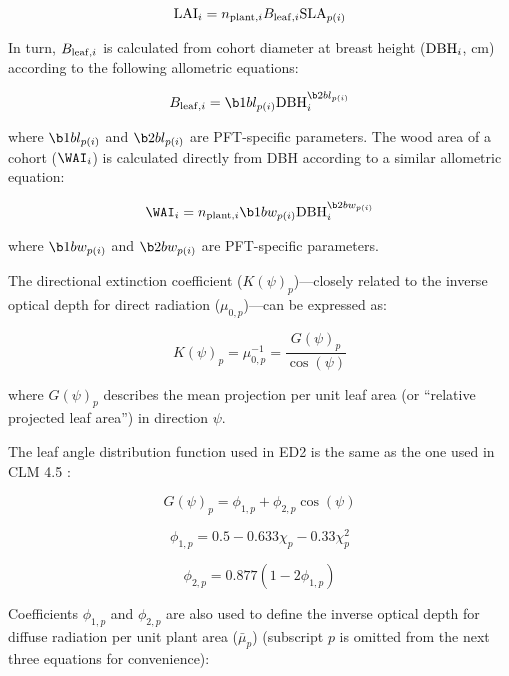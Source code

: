 \begin{equation}
  \mathrm{LAI}_{i} = n_{\mathrm{plant}, i} B_{\mathrm{leaf}, i} \mathrm{SLA}_{p(i)}
\end{equation}

In turn, $B_{\mathrm{leaf}, i}$ is calculated from cohort diameter at breast height ($\mathrm{DBH}_{i}$, \unit{cm}) according to the following allometric equations:

\begin{equation}
  B_{\leaf, i} = \b1bl_{p(i)} \DBH_{i}^{\b2bl_{p(i)}}
\end{equation}

where $\b1bl_{p(i)}$ and $\b2bl_{p(i)}$ are PFT-specific parameters.
The wood area of a cohort ($\WAI_{i}$) is calculated directly from DBH according to a similar allometric equation:

\begin{equation}
  \WAI_{i} = n_{\plant, i} \b1bw_{p(i)} \DBH_{i}^{\b2bw_{p(i)}}
\end{equation}

where $\b1bw_{p(i)}$ and $\b2bw_{p(i)}$ are PFT-specific parameters.

The directional extinction coefficient ($K(\psi)_p$)---closely related to the inverse optical depth for direct radiation ($\mu_{0,p}$)---can be expressed as:

\begin{equation}
  K(\psi)_p = \mu_{0,p}^{-1} = \frac{G(\psi)_{p}}{\cos(\psi)}
\end{equation}

where $G(\psi)_{p}$ describes the mean projection per unit leaf area (or ``relative projected leaf area'') in direction $\psi$.

The leaf angle distribution function used in ED2 is the same as the one used in CLM 4.5 \citep{clm45_note}:

\begin{equation}
  G(\psi)_{p} = \phi_{1,p} + \phi_{2,p} \cos(\psi)
\end{equation}

\begin{equation}
  \phi_{1,p} = 0.5 - 0.633 \chi_{p} - 0.33 \chi_{p}^2
\end{equation}

\begin{equation}
  \phi_{2,p} = 0.877 (1 - 2 \phi_{1,p})
\end{equation}

Coefficients $\phi_{1,p}$ and $\phi_{2,p}$ are also used to define the inverse optical depth for diffuse radiation per unit plant area ($\bar\mu_{p}$) (subscript $p$ is omitted from the next three equations for convenience):


